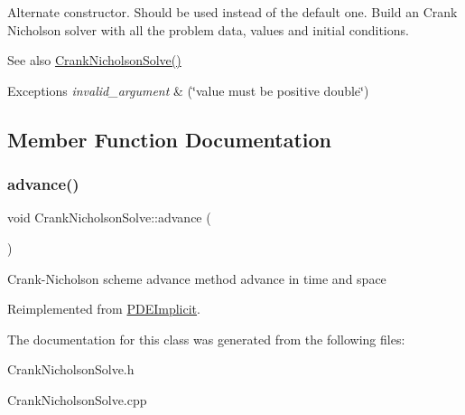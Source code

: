 Alternate constructor. Should be used instead of the default one. Build an Crank Nicholson solver with all the problem data, values and initial conditions. \begin{DoxySeeAlso}{See also}
\hyperlink{class_crank_nicholson_solve_a2c3330fe7e6925da4148d314280ed021}{Crank\+Nicholson\+Solve()} 
\end{DoxySeeAlso}

\begin{DoxyExceptions}{Exceptions}
{\em invalid\+\_\+argument} & (\char`\"{}value must be positive double\char`\"{}) \\
\hline
\end{DoxyExceptions}


\subsection{Member Function Documentation}
\mbox{\label{class_crank_nicholson_solve_a82fe6f2538bc90d62842d26736ba8707}} 
\subsubsection{\texorpdfstring{advance()}{advance()}}
{\footnotesize\ttfamily void Crank\+Nicholson\+Solve\+::advance (\begin{DoxyParamCaption}{ }\end{DoxyParamCaption})\hspace{0.3cm}{\ttfamily [virtual]}}

Crank-\/\+Nicholson scheme advance method advance in time and space 

Reimplemented from \hyperlink{class_p_d_e_implicit_a60980fe1e316329ab95ad179fce5a88b}{P\+D\+E\+Implicit}.



The documentation for this class was generated from the following files\+:\begin{DoxyCompactItemize}
\item 
Crank\+Nicholson\+Solve.\+h\item 
Crank\+Nicholson\+Solve.\+cpp\end{DoxyCompactItemize}
